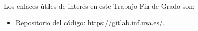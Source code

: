 \label{anexoenlaces}
Los enlaces útiles de interés en este Trabajo Fin de Grado son:

\begin{itemize}
    \item Repositorio del código: \url{https://gitlab.inf.uva.es/}.

\end{itemize}
 
